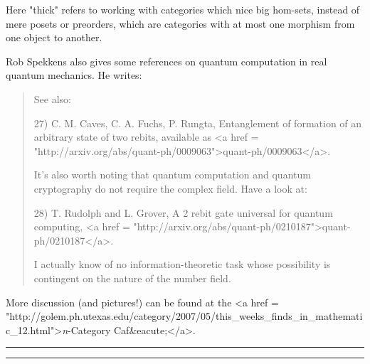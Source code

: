 Here "thick" refers to working with categories which nice
big hom-sets, instead of mere posets or preorders, which are categories 
with at most one morphism from one object to another.

Rob Spekkens also gives some references on quantum computation
in real quantum mechanics.  He writes:

\begin{quote}
See also:

27) C. M. Caves, C. A. Fuchs, P. Rungta, Entanglement of formation of an
arbitrary state of two rebits, available as <a href = "http://arxiv.org/abs/quant-ph/0009063">quant-ph/0009063</a>.

It's also worth noting that quantum computation and quantum cryptography do
not require the complex field.  Have a look at:

28) T. Rudolph and L. Grover, A 2 rebit gate universal for quantum
computing, 
<a href = "http://arxiv.org/abs/quant-ph/0210187">quant-ph/0210187</a>.

I actually know of no information-theoretic task whose possibility is
contingent on the nature of the number field.
\end{quote}

More discussion (and pictures!) can be found at the <a href = "http://golem.ph.utexas.edu/category/2007/05/this_weeks_finds_in_mathematic_12.html">\emph{n}-Category
Caf&eacute;</a>.

\par\noindent\rule{\textwidth}{0.4pt}
\par\noindent\rule{\textwidth}{0.4pt}

